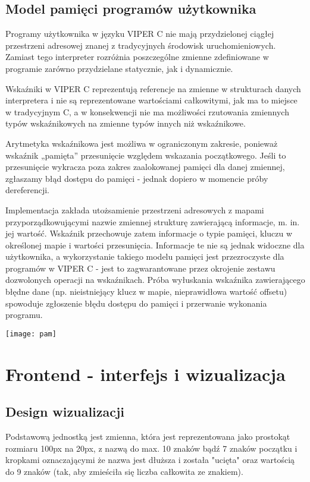 \documentclass[a4paper,twoside,openright,11pt]{report}
\begin{document}
  \section {Model pamięci programów użytkownika}
  \par Programy użytkownika w języku VIPER C nie mają przydzielonej ciągłej przestrzeni adresowej znanej z tradycyjnych środowisk uruchomieniowych. Zamiast tego interpreter rozróżnia poszczególne zmienne zdefiniowane w programie zarówno przydzielane statycznie, jak i dynamicznie. 
  \par Wskaźniki w VIPER C reprezentują referencje na zmienne w strukturach danych interpretera i nie są reprezentowane wartościami całkowitymi, jak ma to miejsce w tradycyjnym C, a w konsekwencji nie ma możliwości rzutowania zmiennych typów wskaźnikowych na zmienne typów innych niż wskaźnikowe. 
  \par Arytmetyka wskaźnikowa jest możliwa w ograniczonym zakresie, ponieważ wskaźnik „pamięta” przesunięcie względem wskazania początkowego. Jeśli to przesunięcie wykracza poza zakres zaalokowanej pamięci dla danej zmiennej, zgłaszamy błąd dostępu do pamięci - jednak dopiero w momencie próby dereferencji. 
  \par Implementacja zakłada utożsamienie przestrzeni adresowych z mapami przyporządkowującymi nazwie zmiennej strukturę zawierającą informacje, m. in. jej wartość. Wskaźnik przechowuje zatem informacje o typie pamięci, kluczu w określonej mapie i wartości przesunięcia. Informacje te nie są jednak widoczne dla użytkownika, a wykorzystanie takiego modelu pamięci jest przezroczyste dla programów w VIPER C - jest to zagwarantowane przez okrojenie zestawu dozwolonych operacji na wskaźnikach. Próba wyłuskania wskaźnika zawierającego błędne dane (np. nieistniejący klucz w mapie, nieprawidłowa wartość offsetu) spowoduje zgłoszenie błędu dostępu do pamięci i przerwanie wykonania programu.

\begin{center}
  \texttt{[image: pam]}
\end{center}

  \chapter{Frontend - interfejs i wizualizacja}
  
  \section {Design wizualizacji}
\par Podstawową jednostką jest zmienna, która jest reprezentowana jako prostokąt rozmiaru 100px na 20px, z nazwą do max. 10 znaków bądź 7 znaków początku i kropkami oznaczającymi że nazwa jest dłuższa i została "ucięta" oraz wartością do 9 znaków (tak, aby zmieściła się liczba całkowita ze znakiem). 
\end{document}
